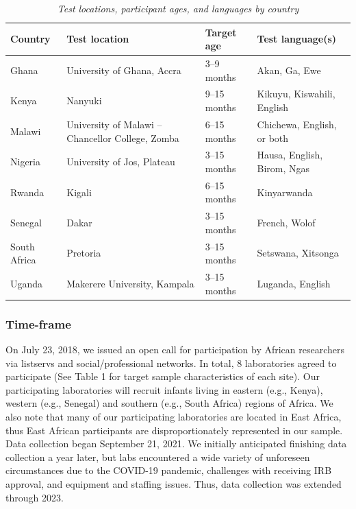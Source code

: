 \documentclass[
  ,man,floatsintext]{apa6}
\begin{document}
\begin{table}[!t]
\caption{\textit{Test locations, participant ages, and languages by country}}
\label{tab:test_locations}
\centering
\begin{tabularx}{\textwidth}{lXlX}
\toprule
\textbf{Country} & \textbf{Test location} & \textbf{Target age} & \textbf{Test language(s)} \\
\midrule
Ghana & University of Ghana, Accra & 3--9 months & Akan, Ga, Ewe \\
Kenya & Nanyuki & 9--15 months & Kikuyu, Kiswahili, English \\
Malawi & University of Malawi -- Chancellor College, Zomba & 6--15 months & Chichewa, English, or both \\
Nigeria & University of Jos, Plateau & 3--15 months & Hausa, English, Birom, Ngas \\
Rwanda & Kigali & 6--15 months & Kinyarwanda \\
Senegal & Dakar & 3--15 months & French, Wolof \\
South Africa & Pretoria & 3--15 months & Setswana, Xitsonga \\
Uganda & Makerere University, Kampala & 3--15 months & Luganda, English \\
\bottomrule
\end{tabularx}
\end{table}

\hypertarget{time-frame}{%
\subsubsection{Time-frame}\label{time-frame}}

On July 23, 2018, we issued an open call for participation by African researchers via listservs and social/professional networks. In total, 8 laboratories agreed to participate (See Table 1 for target sample characteristics of each site). Our participating laboratories will recruit infants living in eastern (e.g., Kenya), western (e.g., Senegal) and southern (e.g., South Africa) regions of Africa. We also note that many of our participating laboratories are located in East Africa, thus East African participants are disproportionately represented in our sample. Data collection began September 21, 2021. We initially anticipated finishing data collection a year later, but labs encountered a wide variety of unforeseen circumstances due to the COVID-19 pandemic, challenges with receiving IRB approval, and equipment and staffing issues. Thus, data collection was extended through 2023.
\end{document}
